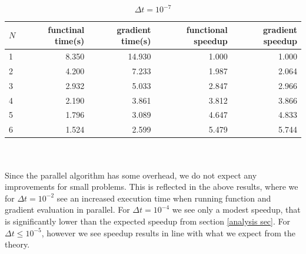 \begin{table}[!h]
\centering
\caption{$\Delta t=10^{-7}$}
\label{speed_table_end}
\begin{tabular}{lrrrr}
\toprule
{}$N$ &  functinal time(s) &  gradient time(s) &  functional speedup &  gradient speedup \\
\midrule
1 &           8.350 &         14.930 &            1.000 &          1.000 \\
2 &           4.200 &          7.233 &            1.987 &          2.064 \\
3 &           2.932 &          5.033 &            2.847 &          2.966 \\
4 &           2.190 &          3.861 &            3.812 &          3.866 \\
5 &           1.796 &          3.089 &            4.647 &          4.833 \\
6 &           1.524 &          2.599 &            5.479 &          5.744 \\
\bottomrule
\end{tabular}
\end{table}
\\
\\
Since the parallel algorithm has some overhead, we do not expect any improvements for small problems. This is reflected in the above results, where we for $\Delta t = 10^{-2}$ see an increased execution time when running function and gradient evaluation in parallel. For $\Delta t = 10^{-4}$ we see only a modest speedup, that is significantly lower than the expected speedup from section \ref{analysis sec}. For $\Delta t \leq 10^{-5}$, however we see speedup results in line with what we expect from the theory.  
